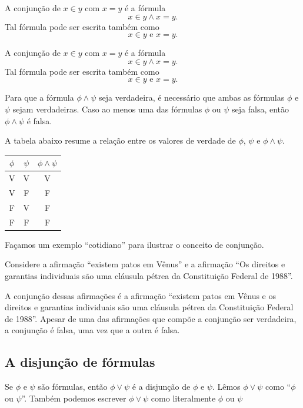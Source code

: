 \begin{example}
    A conjunção de $x\in y$ com $x=y$ é a fórmula
    \[
        x\in y\wedge x=y.
    \]
    Tal fórmula pode ser escrita também como
    \[
        x\in y \text{ e } x=y.
    \]
\end{example}

\begin{example}
    A conjunção de $x\in y$ com $x=y$ é a fórmula
    \[
        x\in y\wedge x=y.
    \]
    Tal fórmula pode ser escrita também como
    \[
        x\in y \text{ e } x=y.
    \]
\end{example}

Para que a fórmula $\phi\wedge \psi$ seja verdadeira, é necessário que ambas as fórmulas $\phi$ e $\psi$ sejam verdadeiras.
Caso ao menos uma das fórmulas $\phi$ ou $\psi$ seja falsa, então $\phi\wedge \psi$ é falsa.

A tabela abaixo resume a relação entre os valores de verdade de $\phi$, $\psi$ e $\phi\wedge \psi$.

\begin{center}
    \begin{tabular}{cc|c}
        $\phi$ & $\psi$ & $\phi\wedge \psi$ \\
        \hline
        V & V & V \\
        V & F & F \\
        F & V & F \\
        F & F & F
    \end{tabular}
\end{center}

Façamos um exemplo ``cotidiano'' para ilustrar o conceito de conjunção.

\begin{example}
    Considere a afirmação ``existem patos em Vênus'' e a afirmação ``Os direitos e garantias individuais são uma cláusula pétrea da Constituição Federal de 1988''.

    A conjunção dessas afirmações é a afirmação ``existem patos em Vênus e os direitos e garantias individuais são uma cláusula pétrea da Constituição Federal de 1988''.
    Apesar de uma das afirmações que compõe a conjunção ser verdadeira, a conjunção é falsa, uma vez que a outra é falsa.
\end{example}

\subsection{A disjunção de fórmulas}
Se $\phi$ e $\psi$ são fórmulas, então $\phi\vee \psi$ é a disjunção de $\phi$ e $\psi$.
Lêmos $\phi\vee \psi$ como ``$\phi$ ou $\psi$''.
Também podemos escrever $\phi\vee \psi$ como literalmente $\phi$ ou $\psi$

